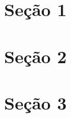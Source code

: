 \documentclass[aspectratio=43]{beamer} %
\begin{document}
\section{Seção 1}

\section{Seção 2}

\section{Seção 3}


\begin{frame}[allowframebreaks]
\tiny


\end{frame}
\end{document}
